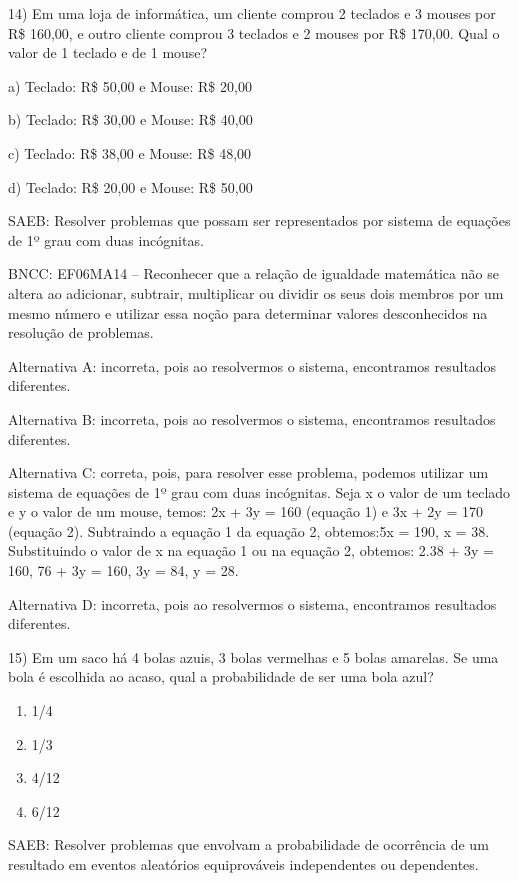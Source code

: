 14) Em uma loja de informática, um cliente comprou 2 teclados e 3 mouses
por R\$ 160,00, e outro cliente comprou 3 teclados e 2 mouses por R\$
170,00. Qual o valor de 1 teclado e de 1 mouse?

a) Teclado: R\$ 50,00 e Mouse: R\$ 20,00

b) Teclado: R\$ 30,00 e Mouse: R\$ 40,00

c) Teclado: R\$ 38,00 e Mouse: R\$ 48,00

d) Teclado: R\$ 20,00 e Mouse: R\$ 50,00

SAEB: Resolver problemas que possam ser representados por sistema de
equações de 1º grau com duas incógnitas.

BNCC: EF06MA14 -- Reconhecer que a relação de igualdade matemática não
se altera ao adicionar, subtrair, multiplicar ou dividir os seus dois
membros por um mesmo número e utilizar essa noção para determinar
valores desconhecidos na resolução de problemas.

Alternativa A: incorreta, pois ao resolvermos o sistema, encontramos
resultados diferentes.

Alternativa B: incorreta, pois ao resolvermos o sistema, encontramos
resultados diferentes.

Alternativa C: correta, pois, para resolver esse problema, podemos
utilizar um sistema de equações de 1º grau com duas incógnitas. Seja x o
valor de um teclado e y o valor de um mouse, temos: 2x + 3y = 160
(equação 1) e 3x + 2y = 170 (equação 2). Subtraindo a equação 1 da
equação 2, obtemos:5x = 190, x = 38. Substituindo o valor de x na
equação 1 ou na equação 2, obtemos: 2.38 + 3y = 160, 76 + 3y = 160, 3y =
84, y = 28.

Alternativa D: incorreta, pois ao resolvermos o sistema, encontramos
resultados diferentes.

15) Em um saco há 4 bolas azuis, 3 bolas vermelhas e 5 bolas amarelas.
Se uma bola é escolhida ao acaso, qual a probabilidade de ser uma bola
azul?

\begin{enumerate}
\def\labelenumi{\alph{enumi})}
\tightlist
\item
  1/4
\item
  1/3
\item
  4/12
\item
  6/12
\end{enumerate}

SAEB: Resolver problemas que envolvam a probabilidade de ocorrência de
um resultado em eventos aleatórios equiprováveis independentes ou
dependentes.


